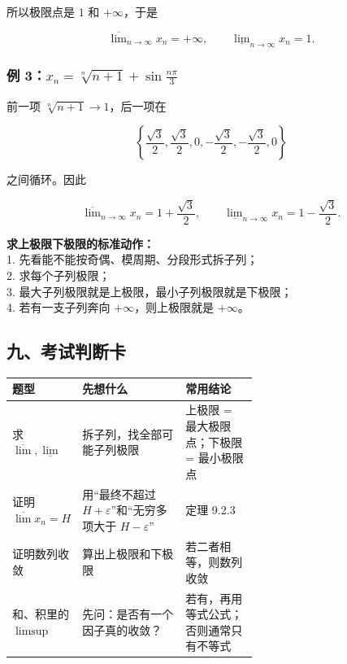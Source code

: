 所以极限点是 \(1\) 和 \(+\infty\)，于是

\[
      \overline{\lim}_{n\to\infty}x_n=+\infty,
      \qquad
      \underline{\lim}_{n\to\infty}x_n=1.
    \]

\subsubsection*{例 3：\(\displaystyle x_n=\sqrt[n]{n+1}+\sin\frac{n\pi}{3}\)}

前一项 \(\sqrt[n]{n+1}\to1\)，后一项在

\[
      \left\{\frac{\sqrt3}{2},\frac{\sqrt3}{2},0,-\frac{\sqrt3}{2},-\frac{\sqrt3}{2},0\right\}
    \]

之间循环。因此

\[
      \overline{\lim}_{n\to\infty}x_n=1+\frac{\sqrt3}{2},
      \qquad
      \underline{\lim}_{n\to\infty}x_n=1-\frac{\sqrt3}{2}.
    \]

\begin{notebox}
\textbf{求上极限下极限的标准动作：}\\  1. 先看能不能按奇偶、模周期、分段形式拆子列；\\  2. 求每个子列极限；\\  3. 最大子列极限就是上极限，最小子列极限就是下极限；\\  4. 若有一支子列奔向 \(+\infty\)，则上极限就是 \(+\infty\)。
\end{notebox}

\subsection*{九、考试判断卡}

\begin{center}
\small
\begin{tabularx}{\linewidth}{|>{\raggedright\arraybackslash}p{0.18\linewidth}|>{\raggedright\arraybackslash}p{0.42\linewidth}|>{\raggedright\arraybackslash}X|}
\hline
\textbf{题型} & \textbf{先想什么} & \textbf{常用结论} \\ \hline
求 \(\overline{\lim},\underline{\lim}\) & 拆子列，找全部可能子列极限 & 上极限 = 最大极限点；下极限 = 最小极限点 \\ \hline
证明 \(\overline{\lim}x_n=H\) & 用“最终不超过 \(H+\varepsilon\)”和“无穷多项大于 \(H-\varepsilon\)” & 定理 9.2.3 \\ \hline
证明数列收敛 & 算出上极限和下极限 & 若二者相等，则数列收敛 \\ \hline
和、积里的 \(\limsup\) & 先问：是否有一个因子真的收敛？ & 若有，再用等式公式；否则通常只有不等式 \\ \hline
\end{tabularx}
\end{center}

